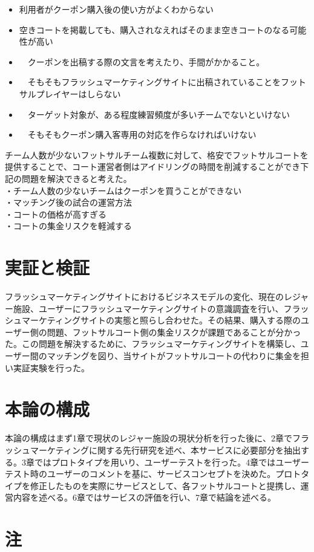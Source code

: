 \begin{itemize}
	\item 利用者がクーポン購入後の使い方がよくわからない
	\item 空きコートを掲載しても、購入されなえればそのまま空きコートのなる可能性が高い
	\item　クーポンを出稿する際の文言を考えたり、手間がかかること。
	\item　そもそもフラッシュマーケティングサイトに出稿されていることをフットサルプレイヤーはしらない
	\item　ターゲット対象が、ある程度練習頻度が多いチームでないといけない
	\item　そもそもクーポン購入客専用の対応を作らなければいけない
\end{itemize}



チーム人数が少ないフットサルチーム複数に対して、格安でフットサルコートを提供することで、コート運営者側はアイドリングの時間を削減することができ下記の問題を解決できると考えた。
\\・チーム人数の少ないチームはクーポンを買うことができない
\\・マッチング後の試合の運営方法
\\・コートの価格が高すぎる
\\・コートの集金リスクを軽減する

\section{実証と検証}
フラッシュマーケティングサイトにおけるビジネスモデルの変化、現在のレジャー施設、ユーザーにフラッシュマーケティングサイトの意識調査を行い、フラッシュマーケティングサイトの実態と照らし合わせた。その結果、購入する際のユーザー側の問題、フットサルコート側の集金リスクが課題であることが分かった。この問題を解決するために、フラッシュマーケティングサイトを構築し、ユーザー間のマッチングを図り、当サイトがフットサルコートの代わりに集金を担い実証実験を行った。
\section{本論の構成}
本論の構成はまず1章で現状のレジャー施設の現状分析を行った後に、2章でフラッシュマーケティングに関する先行研究を述べ、本サービスに必要部分を抽出する。3章ではプロトタイプを用いり、ユーザーテストを行った。4章ではユーザーテスト時のユーザーのコメントを基に、サービスコンセプトを決めた。プロトタイプを修正したものを実際にサービスとして、各フットサルコートと提携し、運営内容を述べる。6章ではサービスの評価を行い、7章で結論を述べる。



\section*{注}
\begin{footnotesize}
\end{footnotesize}

